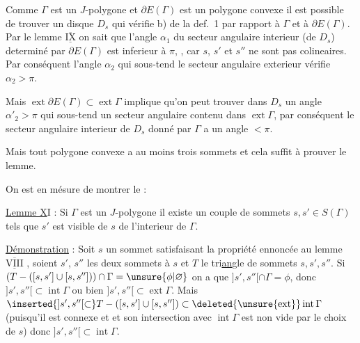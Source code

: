 Comme $\Gamma$ est un $J$-polygone et $\partial E(\Gamma)$ est un polygone convexe il est possible de trouver un disque $D_s$ qui vérifie b) de la def.~1 par rapport à $\Gamma$ et à $\partial E(\Gamma)$. Par le lemme $\underline{\overline{\mathrm{IX}}}$ on sait que l'angle $\alpha_1$ du secteur angulaire interieur (de $D_s$) determiné par $\partial E(\Gamma)$ est inferieur à $\pi$, , car $s$, $s'$ et $s''$ ne sont pas colineaires. Par conséquent l'angle $\alpha_2$ qui sous-tend le secteur angulaire exterieur vérifie $\alpha_2>\pi$.

Mais $\operatorname{ext}\partial E(\Gamma)\subset\operatorname{ext}\Gamma$ implique qu'on peut trouver dans $D_s$ un angle $\alpha'_2>\pi$ qui sous-tend un secteur angulaire contenu dans $\operatorname{ext}\Gamma$, par conséquent le secteur angulaire interieur de $D_s$  donné par $\Gamma$ a un angle $<\pi$.

Mais tout polygone convexe a au moins trois sommets et cela suffit à prouver le lemme.

On est en mésure de montrer le :

\uline{Lemme X}I : Si $\Gamma$ est un $J$-polygone  il existe un couple de sommets $s,s'\in S(\Gamma)$ tels que $s'$ est visible de $s$ de l'interieur de $\Gamma$.

\uline{Démonstration} : Soit $s$ un sommet satisfaisant la propriété ennoncée au lemme $\underline{\overline{\mathrm{VIII}}}$%
, soient $s'$, $s''$ les deux sommets   à $s$ et $T$ le tri\uline{an}gle%
 de sommets $s,s',s''$. Si $(T-([s,s']\cup[s,s'']))\cap\Gamma=\unsure{\phi|\varnothing}$ on a que $]s',s''[\cap\Gamma=\phi$, donc $]s',s''[\subset\operatorname{int}\Gamma$ ou bien $]s',s''[\subset\operatorname{ext}\Gamma$. Mais $\inserted{]s',s''[\subset}T-([s,s']\cup[s,s''])\subset\deleted{\unsure{\operatorname{ext}}}\operatorname{int}\Gamma$ (puisqu'il est connexe et et son intersection avec $\operatorname{int}\Gamma$ est non vide par le choix de $s$) donc $]s',s''[\subset\operatorname{int}\Gamma$.

